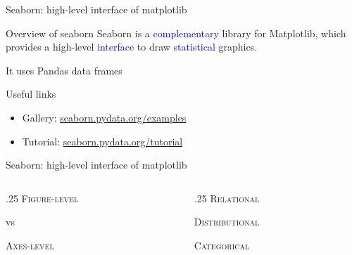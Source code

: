 \documentclass[10pt]{beamer}
\begin{document}
  \begin{frame}{Seaborn: high-level interface of matplotlib}

    \begin{block}{Overview of seaborn}
      \medskip
      Seaborn is a \textcolor{blue}{complementary} library for Matplotlib, which provides a high-level \textcolor{blue}{interface} to draw \textcolor{blue}{statistical} graphics.
  
      It uses Pandas data frames
    \end{block}
  
    \begin{block}{Useful links}
      \medskip
      \begin{itemize}
        \item Gallery: \href{https://seaborn.pydata.org/examples/index.html}{seaborn.pydata.org/examples}
        \item Tutorial: \href{https://seaborn.pydata.org/tutorial.html}{seaborn.pydata.org/tutorial}
      \end{itemize}
      
    \end{block}
  \end{frame}
  
  
  
  \begin{frame}{Seaborn: high-level interface of matplotlib}
  
    \begin{columns}[T]
      \begin{column}{.25\textwidth}
       \medskip
       \centering
       \textsc{Figure-level}
       
       vs
       
       \textsc{Axes-level}
      \end{column}
  
      \begin{column}{.25\textwidth}
        \medskip
        \centering
        \textsc{Relational}
  
        \textsc{Distributional}
  
        \textsc{Categorical}
      \end{column}
  
    \end{columns}
  
    \centering
\end{frame}
  
  
  
\end{document}
